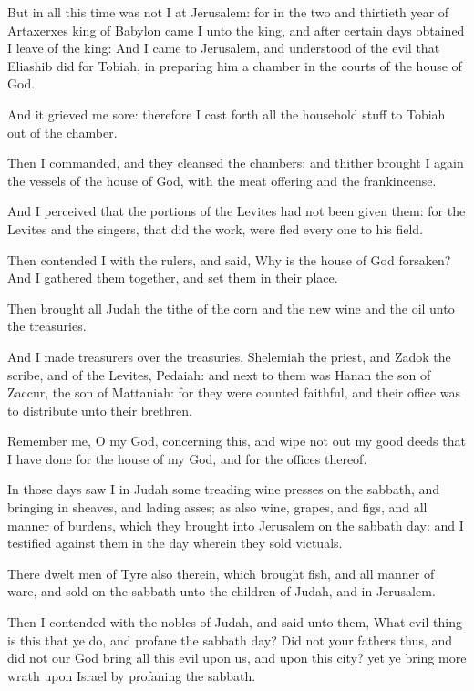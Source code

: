 \verse But in all this time was not I at Jerusalem: for in the two and thirtieth year of Artaxerxes king of Babylon came I unto the king, and after certain days obtained I leave of the king: \verse And I came to Jerusalem, and understood of the evil that Eliashib did for Tobiah, in preparing him a chamber in the courts of the house of God.

\verse And it grieved me sore: therefore I cast forth all the household stuff to Tobiah out of the chamber.

\verse Then I commanded, and they cleansed the chambers: and thither brought I again the vessels of the house of God, with the meat offering and the frankincense.

\verse And I perceived that the portions of the Levites had not been given them: for the Levites and the singers, that did the work, were fled every one to his field.

\verse Then contended I with the rulers, and said, Why is the house of God forsaken? And I gathered them together, and set them in their place.

\verse Then brought all Judah the tithe of the corn and the new wine and the oil unto the treasuries.

\verse And I made treasurers over the treasuries, Shelemiah the priest, and Zadok the scribe, and of the Levites, Pedaiah: and next to them was Hanan the son of Zaccur, the son of Mattaniah: for they were counted faithful, and their office was to distribute unto their brethren.

\verse Remember me, O my God, concerning this, and wipe not out my good deeds that I have done for the house of my God, and for the offices thereof.

\verse In those days saw I in Judah some treading wine presses on the sabbath, and bringing in sheaves, and lading asses; as also wine, grapes, and figs, and all manner of burdens, which they brought into Jerusalem on the sabbath day: and I testified against them in the day wherein they sold victuals.

\verse There dwelt men of Tyre also therein, which brought fish, and all manner of ware, and sold on the sabbath unto the children of Judah, and in Jerusalem.

\verse Then I contended with the nobles of Judah, and said unto them, What evil thing is this that ye do, and profane the sabbath day?  \verse Did not your fathers thus, and did not our God bring all this evil upon us, and upon this city? yet ye bring more wrath upon Israel by profaning the sabbath.

